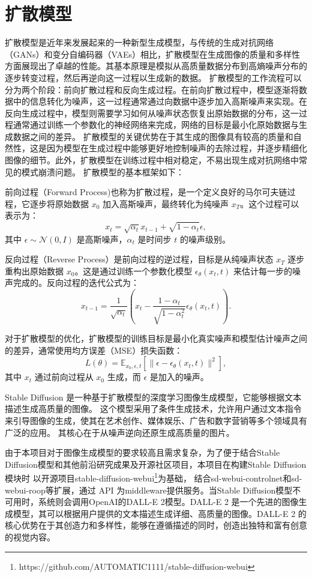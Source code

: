 \documentclass[a4paper,AutoFakeBold,oneside,12pt]{book}
\begin{document}
\section{扩散模型}
扩散模型是近年来发展起来的一种新型生成模型，与传统的生成对抗网络（GANs）和变分自编码器（VAEs）相比，扩散模型在生成图像的质量和多样性方面展现出了卓越的性能。其基本原理是模拟从高质量数据分布到高熵噪声分布的逐步转变过程，然后再逆向这一过程以生成新的数据。
扩散模型的工作流程可以分为两个阶段：前向扩散过程和反向生成过程。在前向扩散过程中，模型逐渐将数据中的信息转化为噪声，这一过程通常通过向数据中逐步加入高斯噪声来实现。在反向生成过程中，模型则需要学习如何从噪声状态恢复出原始数据的分布，这一过程通常通过训练一个参数化的神经网络来完成，网络的目标是最小化原始数据与生成数据之间的差异。
扩散模型的关键优势在于其生成的图像具有较高的质量和自然性，这是因为模型在生成过程中能够更好地控制噪声的去除过程，并逐步精细化图像的细节。此外，扩散模型在训练过程中相对稳定，不易出现生成对抗网络中常见的模式崩溃问题。
扩散模型的基本框架如下：

前向过程（Forward Process)也称为扩散过程，是一个定义良好的马尔可夫链过程，它逐步将原始数据 \( x_0 \) 加入高斯噪声，最终转化为纯噪声 \( x_T \)。这个过程可以表示为：
\[ x_t = \sqrt{\alpha_t} x_{t-1} + \sqrt{1 - \alpha_t} \epsilon, \]
其中 \( \epsilon \sim \mathcal{N}(0, I) \) 是高斯噪声，\( \alpha_t \) 是时间步 \( t \) 的噪声级别。

反向过程（Reverse Process）是前向过程的逆过程，目标是从纯噪声状态 \( x_T \) 逐步重构出原始数据 \( x_0 \)。这是通过训练一个参数化模型 \( \epsilon_\theta(x_t, t) \) 来估计每一步的噪声完成的。反向过程的迭代公式为：
\[ x_{t-1} = \frac{1}{\sqrt{\alpha_t}} \left(x_t - \frac{1-\alpha_t}{\sqrt{1-\alpha_t^2}} \epsilon_\theta(x_t, t)\right). \]

对于扩散模型的优化，扩散模型的训练目标是最小化真实噪声和模型估计噪声之间的差异，通常使用均方误差（MSE）损失函数：
\[ L(\theta) = \mathbb{E}_{x_0, \epsilon, t}\left[ \|\epsilon - \epsilon_\theta(x_t, t)\|^2 \right], \]
其中 \( x_t \) 通过前向过程从 \( x_0 \) 生成，而 \( \epsilon \) 是加入的噪声。

Stable Diffusion\cite{rombach2022high} 是一种基于扩散模型的深度学习图像生成模型，它能够根据文本描述生成高质量的图像。
这个模型采用了条件生成技术，允许用户通过文本指令来引导图像的生成，使其在艺术创作、媒体娱乐、广告和数字营销等多个领域具有广泛的应用。
其核心在于从噪声逆向还原生成高质量的图片。

由于本项目对于图像生成模型的要求较高且需求复杂，为了便于结合Stable Diffusion模型和其他前沿研究成果及开源社区项目，本项目在构建Stable Diffusion模块时
以开源项目stable-diffusion-webui\footnote{https://github.com/AUTOMATIC1111/stable-diffusion-webui}为基础，
结合sd-webui-controlnet和sd-webui-roop等扩展，通过 API 为middleware提供服务。当Stable Diffusion模型不可用时，系统则会调用OpenAI的DALL-E 2模型。DALL-E 2 是一个先进的图像生成模型，其可以根据用户提供的文本描述生成详细、高质量的图像。DALL-E 2 的核心优势在于其创造力和多样性，能够在遵循描述的同时，创造出独特和富有创意的视觉内容。
\end{document}
